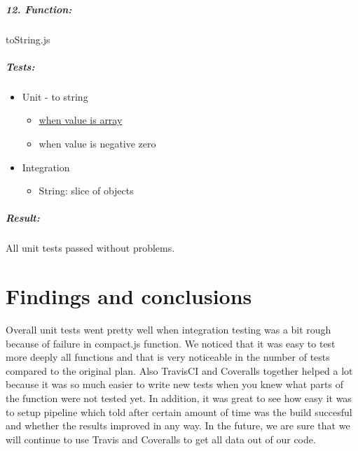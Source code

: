 \documentclass[a4paper, 12pt]{article}
\begin{document}
		\hypertarget{header-n558}{%
		\subparagraph{12. Function:}\label{header-n558}}
		
		toString.js
		
		\hypertarget{header-n560}{%
		\subparagraph{Tests:}\label{header-n560}}
		
		\begin{itemize}
		\item
		Unit - to string
		
		\begin{itemize}
			\item
			\underline{when value is array}
			\item
			when value is negative zero
		\end{itemize}
		\item
		Integration
		
		\begin{itemize}
			\item
			String: slice of objects
		\end{itemize}
		\end{itemize}
		
		\hypertarget{header-n573}{%
		\subparagraph{Result:}\label{header-n573}}
		
		All unit tests passed without problems.

\newpage

\section{Findings and conclusions}
Overall unit tests went pretty well when integration testing was a bit rough because of failure in compact.js function. We noticed that it was easy to test more deeply all functions and that is very noticeable in the number of tests compared to the original plan. Also TravisCI and Coveralls together helped a lot because it was so much easier to write new tests when you knew what parts of the function were not tested yet. In addition, it was great to see how easy it was to setup pipeline which told after certain amount of time was the build succesful and whether the results improved in any way. In the future, we are sure that we will continue to use Travis and Coveralls to get all data out of our code. 





\end{document}

